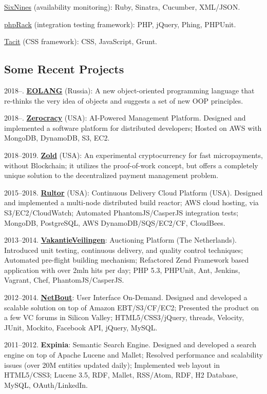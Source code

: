 \documentclass{yb}
\begin{document}
\href{https://www.sixnines.io}{SixNines} (availability monitoring):
Ruby, Sinatra, Cucumber, XML/JSON.

\href{https://www.phprack.com}{phpRack} (integration testing framework):
PHP, jQuery, Phing, PHPUnit.

\href{https://github.com/yegor256/tacit}{Tacit} (CSS framework):
CSS, JavaScript, Grunt.

\subsection*{Some Recent Projects}

2018--. \href{https://www.eolang.org}{\textbf{EOLANG}} (Russia): A new object-oriented
programming language that re-thinks the very idea of objects
and suggests a set of new OOP principles.

2018--. \href{https://www.zerocracy.com}{\textbf{Zerocracy}} (USA): AI-Powered Management Platform.
Designed and implemented a software platform for distributed developers;
Hosted on AWS with MongoDB, DynamoDB, S3, EC2.

2018--2019. \href{https://www.zold.io}{\textbf{Zold}} (USA): An experimental cryptocurrency for
fast micropayments, without Blockchain; it utilizes the proof-of-work
concept, but offers a completely unique solution to the decentralized
payment management problem.

2015--2018. \href{https://www.rultor.com}{\textbf{Rultor}} (USA): Continuous Delivery Cloud Platform (USA).
Designed and implemented a multi-node distributed build reactor;
AWS cloud hosting, via S3/EC2/CloudWatch;
Automated PhantomJS/CasperJS integration tests;
MongoDB, PostgreSQL, AWS DynamoDB/SQS/EC2/CF, CloudBees.

2013--2014. \href{https://www.VakantieVeilingen.nl}{\textbf{VakantieVeilingen}}: Auctioning Platform (The Netherlands).
Introduced unit testing, continuous delivery, and quality control techniques;
Automated pre-flight building mechanism;
Refactored Zend Framework based application with over 2mln hits per day;
PHP 5.3, PHPUnit, Ant, Jenkins, Vagrant, Chef, PhantomJS/CasperJS.

2012--2014. \href{https://www.netbout.com}{\textbf{NetBout}}: User Interface On-Demand.
Designed and developed a scalable solution on top of Amazon EBT/S3/CF/EC2;
Presented the product on a few VC forums in Silicon Valley;
HTML5/CSS3/jQuery, threads, Velocity, JUnit, Mockito, Facebook API, jQuery, MySQL.

2011--2012. \textbf{Expinia}: Semantic Search Engine.
Designed and developed a search engine on top of Apache Lucene and Mallet;
Resolved performance and scalability issues (over 20M entities updated daily);
Implemented web layout in HTML5/CSS3;
Lucene 3.5, RDF, Mallet, RSS/Atom, RDF, H2 Database, MySQL, OAuth/LinkedIn.
\end{document}
